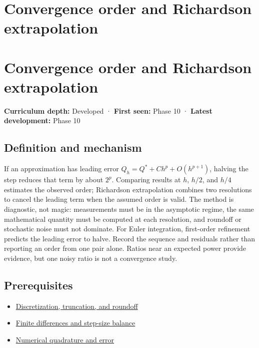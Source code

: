 \hypertarget{appendix-aca80b6bf17a}{}
\section*{Convergence order and Richardson extrapolation}
\section{Convergence order and Richardson extrapolation}\label{appendix-aca80b6bf17a-convergence-order-and-richardson-extrapolation}

\textbf{Curriculum depth:} Developed · \textbf{First seen:} Phase 10 · \textbf{Latest development:} Phase 10

\subsection{Definition and mechanism}\label{appendix-aca80b6bf17a-definition-and-mechanism}

If an approximation has leading error \(Q_h=Q^*+Ch^p+O(h^{p+1})\), halving the step reduces that term by about \(2^p\). Comparing results at \(h\), \(h/2\), and \(h/4\) estimates the observed order; Richardson extrapolation combines two resolutions to cancel the leading term when the assumed order is valid. The method is diagnostic, not magic: measurements must be in the asymptotic regime, the same mathematical quantity must be computed at each resolution, and roundoff or stochastic noise must not dominate. For Euler integration, first-order refinement predicts the leading error to halve. Record the sequence and residuals rather than reporting an order from one pair alone. Ratios near an expected power provide evidence, but one noisy ratio is not a convergence study.

\subsection{Prerequisites}\label{appendix-aca80b6bf17a-prerequisites}

\begin{itemize}
\tightlist
\item
  \hyperref[appendix-6b0648b2b8e8]{Discretization, truncation, and roundoff}
\item
  \hyperref[appendix-e2d7b4f2161d]{Finite differences and step-size balance}
\item
  \hyperref[appendix-80521eae6b71]{Numerical quadrature and error}
\end{itemize}

